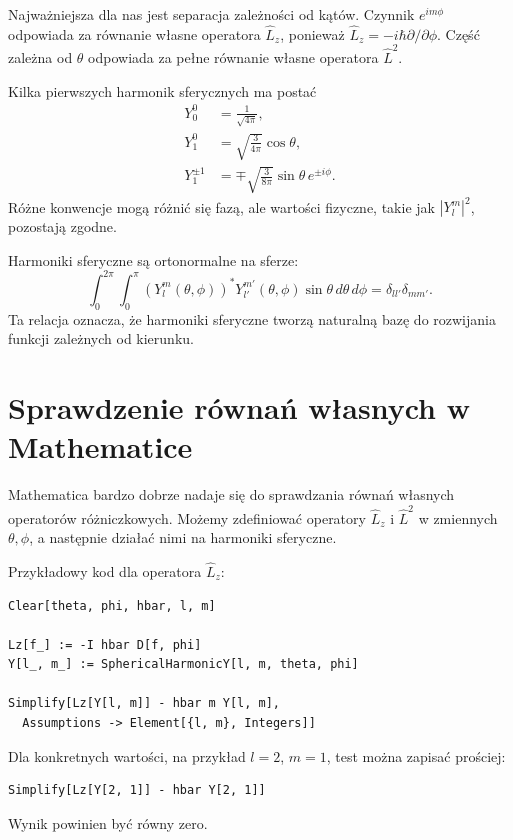 Najważniejsza dla nas jest separacja zależności od kątów. Czynnik \(e^{im\phi}\) odpowiada za równanie własne operatora \(\hat{L}_z\), ponieważ \(\hat{L}_z=-i\hbar\partial/\partial\phi\). Część zależna od \(\theta\) odpowiada za pełne równanie własne operatora \(\hat{L}^2\).

Kilka pierwszych harmonik sferycznych ma postać
\begin{align}
    Y_0^0 &= \frac{1}{\sqrt{4\pi}}, \\
    Y_1^0 &= \sqrt{\frac{3}{4\pi}}\cos\theta, \\
    Y_1^{\pm 1} &= \mp\sqrt{\frac{3}{8\pi}}\sin\theta\,e^{\pm i\phi}.
\end{align}
Różne konwencje mogą różnić się fazą, ale wartości fizyczne, takie jak \(|Y_l^m|^2\), pozostają zgodne.

Harmoniki sferyczne są ortonormalne na sferze:
\begin{equation}
    \int_0^{2\pi}\int_0^\pi
    \left(Y_l^m(\theta,\phi)\right)^*Y_{l'}^{m'}(\theta,\phi)
    \sin\theta\,d\theta\,d\phi
    =\delta_{ll'}\delta_{mm'}.
\end{equation}
Ta relacja oznacza, że harmoniki sferyczne tworzą naturalną bazę do rozwijania funkcji zależnych od kierunku.

\section{Sprawdzenie równań własnych w Mathematice}

Mathematica bardzo dobrze nadaje się do sprawdzania równań własnych operatorów różniczkowych. Możemy zdefiniować operatory \(\hat{L}_z\) i \(\hat{L}^2\) w zmiennych \(\theta,\phi\), a następnie działać nimi na harmoniki sferyczne.

Przykładowy kod dla operatora \(\hat{L}_z\):
\begin{verbatim}
Clear[theta, phi, hbar, l, m]

Lz[f_] := -I hbar D[f, phi]
Y[l_, m_] := SphericalHarmonicY[l, m, theta, phi]

Simplify[Lz[Y[l, m]] - hbar m Y[l, m],
  Assumptions -> Element[{l, m}, Integers]]
\end{verbatim}

Dla konkretnych wartości, na przykład \(l=2\), \(m=1\), test można zapisać prościej:
\begin{verbatim}
Simplify[Lz[Y[2, 1]] - hbar Y[2, 1]]
\end{verbatim}
Wynik powinien być równy zero.

